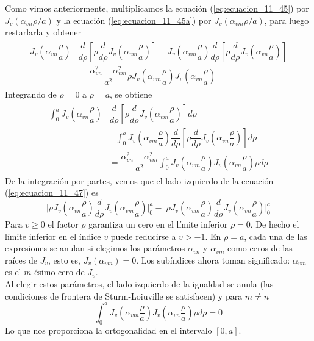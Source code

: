 Como vimos anteriormente, multiplicamos la ecuación (\ref{eq:ecuacion_11_45}) por $J_{v}(\alpha_{vn} \rho /a)$ y la ecuación (\ref{eq:ecuacion_11_45a}) por $J_{v}(\alpha_{vm} \rho /a)$, para luego restarlarla y obtener
\begin{eqnarray}
\begin{aligned}
J_{v} \left( \alpha_{vn} \dfrac{\rho}{a} \right) &  \dfrac{d}{d \rho} \left[ \rho \dfrac{d}{d \rho} J_{v} \left( \alpha_{vm} \dfrac{\rho}{a} \right) \right] - J_{v} \left( \alpha_{vm} \dfrac{\rho}{a} \right) \dfrac{d}{d \rho} \left[ \rho \dfrac{d}{d \rho} J_{v} \left( \alpha_{vn} \dfrac{\rho}{a} \right) \right] \\
&= \dfrac{\alpha^{2}_{vn} - \alpha^{2}_{vm}}{a^{2}} \rho J_{v} \left( \alpha_{vm} \dfrac{\rho}{a} \right) J_{v} \left( \alpha_{vn} \dfrac{\rho}{a} \right)
\end{aligned}
\label{eq:ecuacion_11_46}
\end{eqnarray}
Integrando de $\rho = 0$ a $\rho = a$, se obtiene
\begin{eqnarray}
\begin{aligned}
\int_{0}^{a} J_{v} \left( \alpha_{vn} \dfrac{\rho}{a} \right) &  \dfrac{d}{d \rho} \left[ \rho \dfrac{d}{d \rho} J_{v} \left( \alpha_{vm} \dfrac{\rho}{a} \right) \right] d \rho \\
& - \int_{0}^{a} J_{v} \left( \alpha_{vm} \dfrac{\rho}{a} \right) \dfrac{d}{d \rho} \left[ \rho \dfrac{d}{d \rho} J_{v} \left( \alpha_{vn} \dfrac{\rho}{a} \right) \right] d \rho \\
&= \dfrac{\alpha^{2}_{vn} - \alpha^{2}_{vm}}{a^{2}} \int_{0}^{a} J_{v} \left( \alpha_{vm} \dfrac{\rho}{a} \right) J_{v} \left( \alpha_{vn} \dfrac{\rho}{a} \right) \rho d \rho
\end{aligned}
\label{eq:ecuacion_11_47}
\end{eqnarray}
De la integración por partes, vemos que el lado izquierdo de la ecuación (\ref{eq:ecuacion_11_47}) es
\begin{equation}
\bigg\vert \rho J_{v} \left( \alpha_{vn} \dfrac{\rho}{a} \right) \dfrac{d}{d \rho} J_{v} \left( \alpha_{vm} \dfrac{\rho}{a} \right) \bigg\vert_{0}^{a} - \bigg\vert \rho J_{v} \left( \alpha_{vm} \dfrac{\rho}{a} \right) \dfrac{d}{d \rho} J_{v} \left( \alpha_{vn} \dfrac{\rho}{a} \right) \bigg\vert_{0}^{a} 
\label{eq:ecuacion_11_48}
\end{equation}
Para $v \geq 0$ el factor $\rho$ garantiza un cero en el límite inferior $\rho = 0$. De hecho el límite inferior en el índice $v$ puede reducirse a $v>-1$. En $\rho = a$, cada una de las expresiones se anulan si elegimos los parámetros $\alpha_{vn}$ y $\alpha_{vm}$ como ceros de las raíces de $J_{v}$, esto es, $J_{v}(\alpha_{vm})=0$. Los subíndices ahora toman significado: $\alpha_{vm}$ es el $m$-ésimo cero de $J_{v}$.
\\
Al elegir estos parámetros, el lado izquierdo de la igualdad se anula (las condiciones de frontera de Sturm-Loiuville se satisfacen) y para $m \neq n$
\begin{equation}
\int_{0}^{a} J_{v} \left( \alpha_{vm} \dfrac{\rho}{a} \right) J_{v} \left( \alpha_{vn} \dfrac{\rho}{a} \right) \rho d \rho = 0
\label{eq:ecuacion_11_49}
\end{equation}
Lo que nos proporciona la ortogonalidad en el intervalo $[0,a]$.
